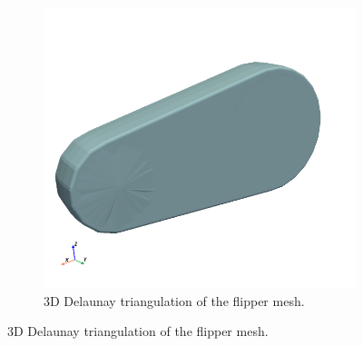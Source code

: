 \documentclass[a4paper,12pt]{article}
\begin{document}
\begin{figure}[H]
\begin{subfigure}[t]{0.45\textwidth}
      \includegraphics[width=\textwidth]{fig/flipper_delaunay.png} %
      \caption{3D Delaunay triangulation of the flipper mesh.}
      \label{fig:fig2}
  \end{subfigure}

  \vspace{0.5cm} %


\end{figure}
\end{document}
